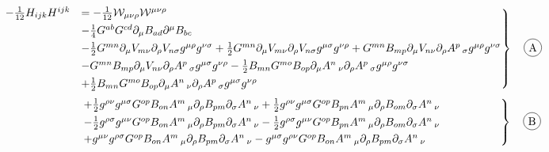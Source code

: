\documentclass{article}
\numberwithin{equation}{section}
\newcommand*\circled[1]{\tikz[baseline=(char.base)]{ \node[shape=circle,draw,inner sep=2pt] (char) {#1};}} %
\newcommand\f[1]{\mathopen{\hphantom{#1}}} %
\begin{document}
\begin{equation*}
\begin{split}
\begin{rcases}
-\frac{1}{12} H_{i j k} H^{i j k} &= -\frac{1}{12} \mathcal{W}_{\mu \nu \rho} \mathcal{W}^{\mu \nu \rho}\\
& - \frac{1}{4} G^{a b} G^{c d} \partial_{\mu} B_{a d} \partial^{\mu} B_{b c}\\
&- \frac{1}{2}G^{m n} \partial_{\mu}{V_{m \nu}} \partial_{\rho}{V_{n \sigma}} g^{\mu \rho} g^{\nu \sigma}+\frac{1}{2}G^{m n} \partial_{\mu}{V_{m \nu}} \partial_{\rho}{V_{n \sigma}} g^{\mu \sigma} g^{\nu \rho} + G^{m n} B_{m p} \partial_{\mu}{V_{n \nu}} \partial_{\rho}{A^{p}\,_{\sigma}} g^{\mu \rho} g^{\nu \sigma}\\
& - G^{m n} B_{m p} \partial_{\mu}{V_{n \nu}} \partial_{\rho}{A^{p}\,_{\sigma}} g^{\mu \sigma} g^{\nu \rho} - \frac{1}{2}B_{m n} G^{m o} B_{o p} \partial_{\mu}{A^{n}\,_{\nu}} \partial_{\rho}{A^{p}\,_{\sigma}} g^{\mu \rho} g^{\nu \sigma}\\
&+\frac{1}{2}B_{m n} G^{m o} B_{o p} \partial_{\mu}{A^{n}\,_{\nu}} \partial_{\rho}{A^{p}\,_{\sigma}} g^{\mu \sigma} g^{\nu \rho}
\end{rcases}
\quad \circled{A}
\end{split}
\end{equation*}
\begin{equation*}
\begin{split}
\begin{rcases}
& \f{123456789123} +\frac{1}{2} g^{\rho \nu} g^{\mu \sigma} G^{o p} B_{o n} A^{m}\,_{\mu} \partial_{\rho}{B_{p m}} \partial_{\sigma}{A^{n}\,_{\nu}} + \frac{1}{2} g^{\rho \nu} g^{\mu \sigma} G^{o p} B_{p n} A^{m}\,_{\mu} \partial_{\rho}{B_{o m}}  \partial_{\sigma}{A^{n}\,_{\nu}} \f{12345678912}\\
& \f{123456789123} - \frac{1}{2}g^{\rho \sigma} g^{\mu \nu} G^{o p} B_{o n} A^{m}\,_{\mu} \partial_{\rho}{B_{p m}} \partial_{\sigma}{A^{n}\,_{\nu}} - \frac{1}{2}g^{\rho \sigma} g^{\mu \nu} G^{o p} B_{p n} A^{m}\,_{\mu} \partial_{\rho}{B_{o m}} \partial_{\sigma}{A^{n}\,_{\nu}} \f{12345678912} \\
& \f{123456789123} + g^{\mu \nu} g^{\rho \sigma} G^{o p} B_{o n} A^{m}\,_{\mu}  \partial_{\rho}{B_{p m}} \partial_{\sigma}{A^{n}\,_{\nu}} - g^{\mu \sigma} g^{\rho \nu} G^{o p} B_{o n} A^{m}\,_{\mu} \partial_{\rho}{B_{p m}} \partial_{\sigma}{A^{n}\,_{\nu}} \f{12345678912}
\end{rcases}
\quad \circled{B}
\end{split}
\end{equation*}
\end{document}
